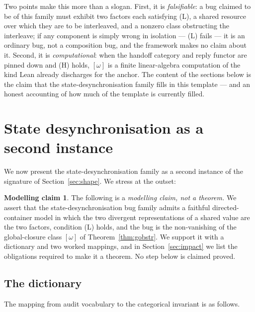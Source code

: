\documentclass[11pt]{amsart}
\theoremstyle{definition}
\newtheorem{modelclaim}[theorem]{Modelling claim}
\theoremstyle{remark}
\begin{document}
Two points make this more than a slogan. First, it is \emph{falsifiable}: a bug claimed to be of
this family must exhibit two factors each satisfying (L), a shared resource over which they are to be
interleaved, and a nonzero class obstructing the interleave; if any component is simply wrong in
isolation --- (L) fails --- it is an ordinary bug, not a composition bug, and the framework makes no
claim about it. Second, it is \emph{computational}: when the handoff category and reply functor are
pinned down and (H) holds, $[\omega]$ is a finite linear-algebra computation of the kind Lean already
discharges for the anchor. The content of the sections below is the claim that the
state-desynchronisation family fills in this template --- and an honest accounting of how much of the
template is currently filled.

\section{State desynchronisation as a second instance}\label{sec:statediv}

We now present the state-desynchronisation family as a second instance of the signature of
Section~\ref{sec:shape}. We stress at the outset:

\begin{modelclaim}\label{mc:main}
The following is a \emph{modelling claim, not a theorem.} We assert that the state-desynchronisation
bug family admits a faithful directed-container model in which the two divergent representations of a
shared value are the two factors, condition (L) holds, and the bug is the non-vanishing of the
global-closure class $[\omega]$ of Theorem~\ref{thm:gobstr}. We support it with a dictionary and two
worked mappings, and in Section~\ref{sec:impact} we list the obligations required to make it a
theorem. No step below is claimed proved.
\end{modelclaim}

\subsection*{The dictionary}
The mapping from audit vocabulary to the categorical invariant is as follows.
\end{document}
